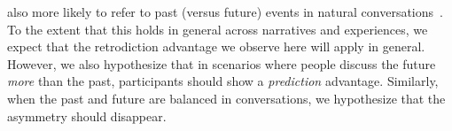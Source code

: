 \documentclass[10pt]{article}
\begin{document}
also more likely to refer to past (versus future) events in natural conversations~\citep{DemiEtal18}.  To the extent that this holds in general across narratives and experiences, we expect that the retrodiction advantage we observe here will apply in general.  However, we also hypothesize that in scenarios where people discuss the future \textit{more} than the past, participants should show a \textit{prediction} advantage.  Similarly, when the past and future are balanced in conversations, we hypothesize that the asymmetry should disappear.


\end{document}
